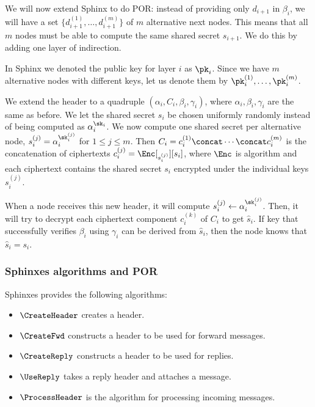 We will now extend Sphinx to do \ac{POR}: instead of providing only \(d_{i+1}\) 
in \(\beta_i\), we will have a set \(\{d_{i+1}^{(1)}, \dotsc, d_{i+1}^{(m)}\}\) 
of \(m\) alternative next nodes.
This means that all \(m\) nodes must be able to compute the same shared secret 
\(s_{i+1}\).
We do this by adding one layer of indirection.

In Sphinx we denoted the public key for layer \(i\) as \(\pk_i\).
Since we have \(m\) alternative nodes with different keys, let us denote them 
by \(\pk_i^{(1)}, \dotsc, \pk_i^{(m)}\).

We extend the header to a quadruple \((\alpha_i, C_i, \beta_i, \gamma_i)\), 
where \(\alpha_i, \beta_i, \gamma_i\) are the same as before.
We let the shared secret \(s_i\) be chosen uniformly randomly instead of being 
computed as \(\alpha_i^{\sk_i}\).
We now compute one shared secret per alternative node, \ie \(s_i^{(j)} = 
  \alpha_i^{\sk_i^{(j)}}\) for \(1\leq j\leq m\).
Then \(C_i = c_i^{(1)}\concat \dotsb\concat c_i^{(m)}\) is the concatenation of 
ciphertexts \(c_i^{(j)} = \Enc[_{s_i^{(j)}}][s_i]\), where \(\Enc\) is 
 algorithm and each ciphertext contains the shared secret \(s_i\) 
encrypted under the individual keys \(s_i^{(j)}\). 

When a node receives this new header, it will compute \(s_i^{(j)}\gets 
  \alpha_i^{\sk_i^{(j)}}\).
Then, it will try to decrypt each ciphertext component \(c_i^{(k)}\) of \(C_i\) 
to get \(\hat s_i\).
If  key that successfully verifies \(\beta_i\) using \(\gamma_i\) can 
be derived from \(\hat s_i\), then the node knows that \(\hat s_i = s_i\).


\subsubsection{Sphinxes algorithms and \acf*{POR}}

Sphinxes provides the following algorithms:
\begin{itemize}
  \item \(\CreateHeader\) creates a header.

  \item \(\CreateFwd\) constructs a header to be used for forward messages.

  \item \(\CreateReply\) constructs a header to be used for replies.

  \item \(\UseReply\) takes a reply header and attaches a message.

  \item \(\ProcessHeader\) is the algorithm for processing incoming messages.
\end{itemize}

